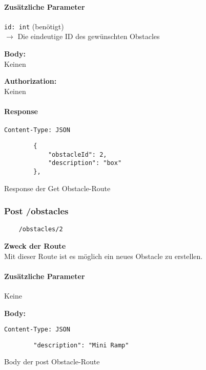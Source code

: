 \paragraph{Zusätzliche Parameter}
\lstinline{id: int} (benötigt) \\
$\rightarrow$ Die eindeutige ID des gewünschten Obstacles


\textbf{Body:} \\
Keinen

\textbf{Authorization:} \\
Keinen

\paragraph{Response }
\begin{code}
    \lstinline{Content-Type: JSON}
    \begin{lstlisting}
        {
            "obstacleId": 2,
            "description": "box"
        },
    \end{lstlisting}
    \caption{Response der Get Obstacle-Route}
\end{code}

\pagebreak


\subsubsection{Post /obstacles}

\begin{lstlisting}
    /obstacles/2
\end{lstlisting}

\textbf{Zweck der Route} \\
Mit dieser Route ist es möglich ein neues Obstacle zu erstellen.





\paragraph{Zusätzliche Parameter}
Keine


\textbf{Body:} \\
\begin{code}
    \lstinline{Content-Type: JSON}
    \begin{lstlisting}
        "description": "Mini Ramp"
    \end{lstlisting}
    \caption{Body der post Obstacle-Route}
\end{code}

